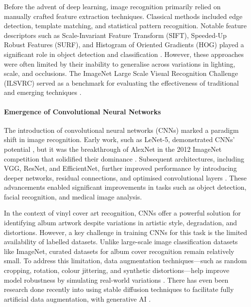                 Before the advent of deep learning, image recognition primarily relied on manually crafted feature extraction techniques. Classical methods included edge detection, template matching, and statistical pattern recognition. Notable feature descriptors such as Scale-Invariant Feature Transform (SIFT), Speeded-Up Robust Features (SURF), and Histogram of Oriented Gradients (HOG) played a significant role in object detection and classification \cite{pal2001pattern}. However, these approaches were often limited by their inability to generalise across variations in lighting, scale, and occlusions. The ImageNet Large Scale Visual Recognition Challenge (ILSVRC) served as a benchmark for evaluating the effectiveness of traditional and emerging techniques \cite{russakovsky2015imagenetlargescalevisual}.
            
            \paragraph{Emergence of Convolutional Neural Networks}
            
                The introduction of convolutional neural networks (CNNs) marked a paradigm shift in image recognition. Early work, such as LeNet-5, demonstrated CNNs' potential \cite{726791}, but it was the breakthrough of AlexNet in the 2012 ImageNet competition that solidified their dominance \cite{imagenetclasscnn}. Subsequent architectures, including VGG, ResNet, and EfficientNet, further improved performance by introducing deeper networks, residual connections, and optimised convolutional layers \cite{deppcnnsforimagerecognition}. These advancements enabled significant improvements in tasks such as object detection, facial recognition, and medical image analysis.
    
                In the context of vinyl cover art recognition, CNNs offer a powerful solution for identifying album artwork despite variations in artistic style, degradation, and distortions. However, a key challenge in training CNNs for this task is the limited availability of labelled datasets. Unlike large-scale image classification datasets like ImageNet, curated datasets for album cover recognition remain relatively small. To address this limitation, data augmentation techniques—such as random cropping, rotation, colour jittering, and synthetic distortions—help improve model robustness by simulating real-world variations \cite{LIN2025102660}. There has even been research done recently into using stable diffusion techniques to facilitate fully artificial data augmentation, with generative AI \cite{Alimisis2025}.
    
